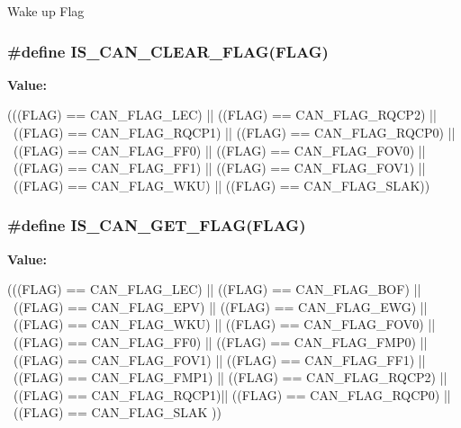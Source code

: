\label{group__CAN__flags_ga18c72dbe75cb80e8b5126c23c9120818}
Wake up Flag \hypertarget{group__CAN__flags_gac46f5fb953efb6163cf3b2e33a514d0c}{
\subsubsection[{IS\_\-CAN\_\-CLEAR\_\-FLAG}]{\setlength{\rightskip}{0pt plus 5cm}\#define IS\_\-CAN\_\-CLEAR\_\-FLAG(FLAG)}}
\label{group__CAN__flags_gac46f5fb953efb6163cf3b2e33a514d0c}
{\bfseries Value:}
\begin{DoxyCode}
(((FLAG) == CAN_FLAG_LEC) || ((FLAG) == CAN_FLAG_RQCP2) || \
                                ((FLAG) == CAN_FLAG_RQCP1)  || ((FLAG) == 
      CAN_FLAG_RQCP0) || \
                                ((FLAG) == CAN_FLAG_FF0)  || ((FLAG) == 
      CAN_FLAG_FOV0) ||\
                                ((FLAG) == CAN_FLAG_FF1) || ((FLAG) == 
      CAN_FLAG_FOV1) || \
                                ((FLAG) == CAN_FLAG_WKU) || ((FLAG) == 
      CAN_FLAG_SLAK))
\end{DoxyCode}
\hypertarget{group__CAN__flags_ga38d33d1762ed3a331d214cdb3249866e}{
\subsubsection[{IS\_\-CAN\_\-GET\_\-FLAG}]{\setlength{\rightskip}{0pt plus 5cm}\#define IS\_\-CAN\_\-GET\_\-FLAG(FLAG)}}
\label{group__CAN__flags_ga38d33d1762ed3a331d214cdb3249866e}
{\bfseries Value:}
\begin{DoxyCode}
(((FLAG) == CAN_FLAG_LEC)  || ((FLAG) == CAN_FLAG_BOF)   || \
                               ((FLAG) == CAN_FLAG_EPV)  || ((FLAG) == 
      CAN_FLAG_EWG)   || \
                               ((FLAG) == CAN_FLAG_WKU)  || ((FLAG) == 
      CAN_FLAG_FOV0)  || \
                               ((FLAG) == CAN_FLAG_FF0)  || ((FLAG) == 
      CAN_FLAG_FMP0)  || \
                               ((FLAG) == CAN_FLAG_FOV1) || ((FLAG) == 
      CAN_FLAG_FF1)   || \
                               ((FLAG) == CAN_FLAG_FMP1) || ((FLAG) == 
      CAN_FLAG_RQCP2) || \
                               ((FLAG) == CAN_FLAG_RQCP1)|| ((FLAG) == 
      CAN_FLAG_RQCP0) || \
                               ((FLAG) == CAN_FLAG_SLAK ))
\end{DoxyCode}
